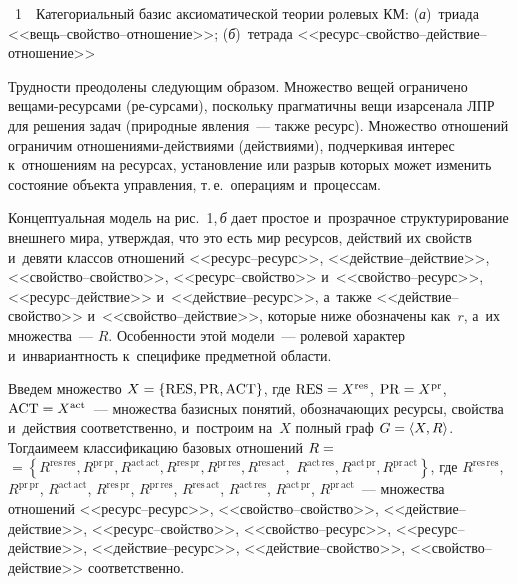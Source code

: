 \begin{multicols}{2}
\noindent
{{\figurename~1}\ \ \small{Категориальный базис аксиоматической теории ролевых КМ: 
(\textit{а})~триада <<вещь--свой\-ст\-во--от\-но\-ше\-ние>>; (\textit{б})~тетрада  
<<ре\-сурс--свой\-ст\-во--дей\-ст\-вие--от\-но\-ше\-ние>>}}

 \vspace*{10pt}
 
 \noindent
Трудности преодолены следующим образом. Множество вещей ограничено  
ве\-ща\-ми-ре\-сур\-са\-ми (ре-\linebreak сурса\-ми), поскольку прагматичны вещи из\linebreak арсенала ЛПР для 
решения задач (природные явления~--- также ресурс). Множество отношений ограничим 
 отноше\-ни\-ями-дей\-ст\-ви\-ями (действиями), подчеркивая интерес к~отношениям на 
ресурсах, установление или разрыв которых может изменить состояние объекта управления, 
т.\,е.\ операциям и~процессам.


  
 
  Концептуальная модель на рис.~1,\,\textit{б} дает прос\-тое и~прозрачное структурирование 
внешнего мира, утверждая, что это есть мир ресурсов, действий их свойств и~девяти классов 
отношений <<ре\-сурс--ре\-сурс>>, <<дей\-ст\-вие--дей\-ст\-вие>>,  
<<свой\-ст\-во--свой\-ст\-во>>, <<ре\-сурс--свой\-ст\-во>> и~<<свой\-ст\-во--ре\-сурс>>, 
<<ре\-сурс--дей\-ст\-вие>> и~<<дей\-ст\-вие--ре\-сурс>>, а~также  
<<дей\-ст\-вие--свой\-ст\-во>> и~<<свой\-ст\-во--дей\-ст\-вие>>, которые ниже обозначены 
как~$r$, а~их множества~--- $R$. Особенности этой модели~--- ролевой характер 
и~инвариантность к~специфике предметной области. 
  
  Введем множество $X\hm= \{\mathrm{RES}, \mathrm{PR}, \mathrm{ACT}\}$, где 
  $\mathrm{RES}\hm = X^{\mathrm{res}}$, $\mathrm{PR}\hm= 
X^{\mathrm{pr}}$, $\mathrm{ACT}\hm= X^{\mathrm{act}}$~--- множества базисных 
понятий, обозначающих ресурсы, 
свойства и~действия соответственно, и~построим на~$X$ полный граф $G\hm= \langle 
X,R\rangle$. Тогда\linebreak имеем классификацию базовых отношений $R\hm=$\linebreak $= 
\left\{ R^{\mathrm{res}\,\mathrm{res}}, 
R^{\mathrm{pr}\,\mathrm{pr}}, R^{\mathrm{act}\,\mathrm{act}}, R^{\mathrm{res}\,\mathrm{pr}}, R^{\mathrm{pr}\,\mathrm{res}}, R^{\mathrm{res}\,\mathrm{act}},\right.$\linebreak
$R^{\mathrm{act}\,\mathrm{res}}, R^{\mathrm{act}\,\mathrm{pr}}, 
\left.R^{\mathrm{pr}\,\mathrm{act}}\right\}$, где 
$R^{\mathrm{res}\,\mathrm{res}}$, $R^{\mathrm{pr}\,\mathrm{pr}}$, 
$R^{\mathrm{act}\,\mathrm{act}}$, $R^{\mathrm{res}\,\mathrm{pr}}$, 
$R^{\mathrm{pr}\,\mathrm{res}}$, $R^{\mathrm{res}\,\mathrm{act}}$, 
$R^{\mathrm{act}\,\mathrm{res}}$, $R^{\mathrm{act}\,\mathrm{pr}}$, 
$R^{\mathrm{pr}\,\mathrm{act}}$~--- множества 
отношений <<ре\-сурс--ре\-сурс>>, <<свой\-ст\-во--свой\-ст\-во>>, <<дей\-ст\-вие--дей\-ст\-вие>>, 
<<ре\-сурс--свой\-ст\-во>>, <<свой\-ст\-во--ре\-сурс>>, <<ре\-сурс--дей\-ст\-вие>>, 
<<дей\-ст\-вие--ре\-сурс>>, <<дей\-ст\-вие--свой\-ст\-во>>, <<свой\-ст\-во--дей\-ст\-вие>> 
соответственно.
  

\end{multicols}
